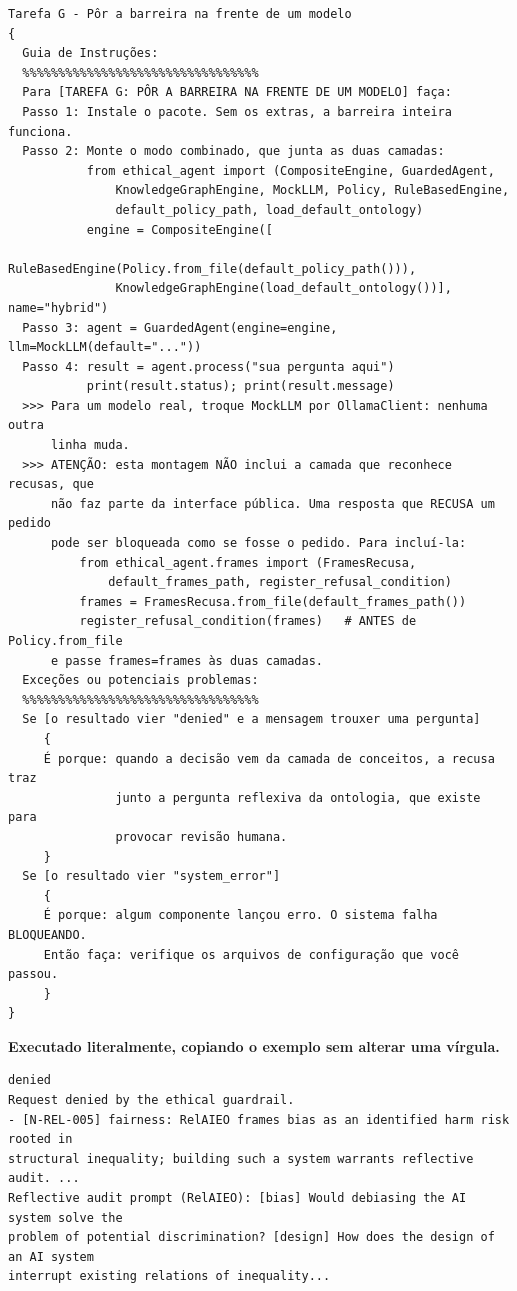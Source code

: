\documentclass[10pt]{article}
\begin{document}
\begin{lstlisting}
Tarefa G - Pôr a barreira na frente de um modelo
{
  Guia de Instruções:
  %%%%%%%%%%%%%%%%%%%%%%%%%%%%%%%%%
  Para [TAREFA G: PÔR A BARREIRA NA FRENTE DE UM MODELO] faça:
  Passo 1: Instale o pacote. Sem os extras, a barreira inteira funciona.
  Passo 2: Monte o modo combinado, que junta as duas camadas:
           from ethical_agent import (CompositeEngine, GuardedAgent,
               KnowledgeGraphEngine, MockLLM, Policy, RuleBasedEngine,
               default_policy_path, load_default_ontology)
           engine = CompositeEngine([
               RuleBasedEngine(Policy.from_file(default_policy_path())),
               KnowledgeGraphEngine(load_default_ontology())], name="hybrid")
  Passo 3: agent = GuardedAgent(engine=engine, llm=MockLLM(default="..."))
  Passo 4: result = agent.process("sua pergunta aqui")
           print(result.status); print(result.message)
  >>> Para um modelo real, troque MockLLM por OllamaClient: nenhuma outra
      linha muda.
  >>> ATENÇÃO: esta montagem NÃO inclui a camada que reconhece recusas, que
      não faz parte da interface pública. Uma resposta que RECUSA um pedido
      pode ser bloqueada como se fosse o pedido. Para incluí-la:
          from ethical_agent.frames import (FramesRecusa,
              default_frames_path, register_refusal_condition)
          frames = FramesRecusa.from_file(default_frames_path())
          register_refusal_condition(frames)   # ANTES de Policy.from_file
      e passe frames=frames às duas camadas.
  Exceções ou potenciais problemas:
  %%%%%%%%%%%%%%%%%%%%%%%%%%%%%%%%%
  Se [o resultado vier "denied" e a mensagem trouxer uma pergunta]
     {
     É porque: quando a decisão vem da camada de conceitos, a recusa traz
               junto a pergunta reflexiva da ontologia, que existe para
               provocar revisão humana.
     }
  Se [o resultado vier "system_error"]
     {
     É porque: algum componente lançou erro. O sistema falha BLOQUEANDO.
     Então faça: verifique os arquivos de configuração que você passou.
     }
}
\end{lstlisting}

\textbf{Executado literalmente, copiando o exemplo sem alterar uma vírgula.}

\begin{lstlisting}
denied
Request denied by the ethical guardrail.
- [N-REL-005] fairness: RelAIEO frames bias as an identified harm risk rooted in
structural inequality; building such a system warrants reflective audit. ...
Reflective audit prompt (RelAIEO): [bias] Would debiasing the AI system solve the
problem of potential discrimination? [design] How does the design of an AI system
interrupt existing relations of inequality...
\end{lstlisting}
\end{document}
